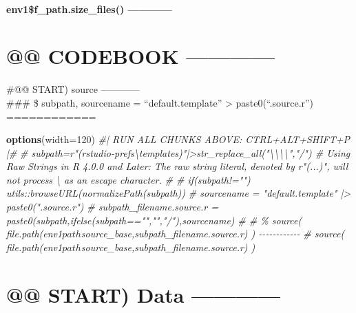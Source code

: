 \documentclass[
]{article}
\newenvironment{Shaded}{\begin{snugshade}}{\end{snugshade}}
\newcommand{\AttributeTok}[1]{\textcolor[rgb]{0.13,0.29,0.53}{#1}}
\newcommand{\CommentTok}[1]{\textcolor[rgb]{0.56,0.35,0.01}{\textit{#1}}}
\newcommand{\DecValTok}[1]{\textcolor[rgb]{0.00,0.00,0.81}{#1}}
\newcommand{\FunctionTok}[1]{\textcolor[rgb]{0.13,0.29,0.53}{\textbf{#1}}}
\newcommand{\NormalTok}[1]{#1}
\begin{document}
\hypertarget{env1f_path.size_files}{%
\paragraph{env1\$f\_path.size\_files()
------------}\label{env1f_path.size_files}}

\hypertarget{codebook}{%
\section{@@ CODEBOOK ------------}\label{codebook}}

\#@@ START) source ------------\\
\#\#\# \$ subpath, sourcename = ``default.template''
\textbar\textgreater{} paste0(``.source.r'') ============

\begin{Shaded}
\begin{Highlighting}[]
\FunctionTok{options}\NormalTok{(}\AttributeTok{width=}\DecValTok{120}\NormalTok{)}
\CommentTok{\#| RUN ALL CHUNKS ABOVE: CTRL+ALT+SHIFT+P |\#}
\CommentTok{\# subpath=r"(rstudio{-}prefs\textbackslash{}templates)"|\textgreater{}str\_replace\_all("\textbackslash{}\textbackslash{}\textbackslash{}\textbackslash{}","/")  \# Using Raw Strings in R 4.0.0 and Later: The raw string literal, denoted by r"(...)", will not process \textbackslash{} as an escape character.}
\CommentTok{\# \# if(subpath!="") utils::browseURL(normalizePath(subpath))}
\CommentTok{\# sourcename = "default.template" |\textgreater{} paste0(".source.r")}
\CommentTok{\# subpath_filename.source.r = paste0(subpath,ifelse(subpath=="","","/"),sourcename)}
\CommentTok{\# \# \% source( file.path(env1$path$source\_base,subpath_filename.source.r) ) {-}{-}{-}{-}{-}{-}{-}{-}{-}{-}{-}{-}  }
\CommentTok{\# source( file.path(env1$path$source\_base,subpath_filename.source.r) )}
\end{Highlighting}
\end{Shaded}

\hypertarget{start-data}{%
\section{@@ START) Data ------------}\label{start-data}}
\end{document}
